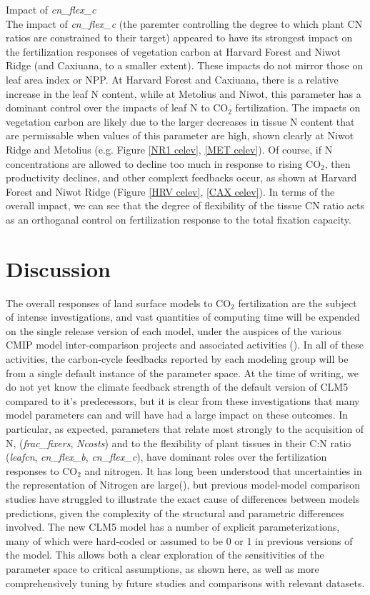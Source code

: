 \documentclass[draft,linenumbers]{agujournal}
\begin{document}
Impact of \emph{cn\_flex\_c}\\
The impact of \emph{cn\_flex\_c} (the paremter controlling the degree to which plant CN ratios are constrained to their target) appeared to have its strongest impact on the fertilization responses of vegetation carbon at Harvard Forest and Niwot Ridge (and Caxiuana, to a smaller extent). These impacts do not mirror those on leaf area index or NPP. At Harvard Forest and Caxiuana, there is a relative increase in the leaf N content, while at Metolius and Niwot, this parameter has a dominant control over the impacts of leaf N to CO$_{2}$ fertilization.  The impacts on vegetation carbon are likely due to the larger decreases in tissue N content that are permissable when values of this parameter are high, shown clearly at Niwot Ridge and Metolius (e.g. Figure \ref{NR1 celev}, \ref{MET celev}).  Of course, if N concentrations are allowed to decline too much in response to rising CO$_{2}$, then productivity declines, and other complext feedbacks occur, as shown at Harvard Forest and Niwot Ridge (Figure \ref{HRV celev}, \ref{CAX celev}).  In terms of the overall impact, we can see that the degree of flexibility of the tissue CN ratio acts as an orthoganal control on fertilization response to the total fixation capacity.

\section{Discussion}
The overall responses of land surface models to CO$_{2}$ fertilization are the subject of intense investigations, and vast quantities of computing time will be expended on the single release version of each model, under the auspices of the various CMIP model inter-comparison projects and associated activities  (\cite{meehl2014}).  In all of these activities, the carbon-cycle feedbacks reported by each modeling group will be from a single default instance of the parameter space.  At the time of writing, we do not yet know the climate feedback strength of the default version of CLM5 compared to it's predecessors, but it is clear from these investigations that many model parameters can and will have had a large impact on these outcomes.  In particular, as expected, parameters that relate most strongly to the acquisition of N, (\emph{frac\_fixers}, \emph{Ncosts}) and to the flexibility of plant tissues in their C:N ratio (\emph{leafcn}, \emph{cn\_flex\_b}, \emph{cn\_flex\_c}), have dominant roles over the fertilization responses to CO$_{2}$ and nitrogen.  It has long been understood that uncertainties in the representation of Nitrogen are large(\cite{zaehle2014}), but previous model-model comparison studies have struggled to illustrate the exact cause of differences between models predictions, given the complexity of the structural and parametric differences involved. The new CLM5 model has a number of explicit parameterizations, many of which were hard-coded or assumed to be 0 or 1 in previous versions of the model. This allows both a clear exploration of the sensitivities of the parameter space to critical assumptions, as shown here, as well as more comprehensively tuning by future studies and comparisons with relevant datasets. 
\end{document}
